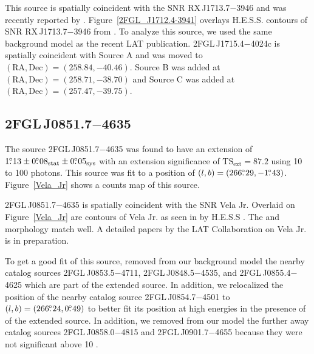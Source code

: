 \documentclass[12pt,preprint]{aastex}
\newcommand{\gev}{\text{GeV}\xspace}
\newcommand{\tev}{\text{TeV}\xspace}
\newcommand{\tsext}{{\ensuremath{\text{TS}_{\text{ext}}}}\xspace}
\newcommand{\sys}{\text{sys}\xspace}
\newcommand{\stat}{\text{stat}\xspace}
\begin{document}
This source is spatially coincident with the SNR RX\,J1713.7$-$3946
and was recently reported by \citep{rx_j1713_lat}.  
Figure~\ref{2FGL_J1712.4-3941} overlays H.E.S.S. \tev contours of SNR 
RX\,J1713.7$-$3946 from \citep{rx_j1713_hess}.  To analyze this source,
we used the same background model as the recent LAT publication.
2FGL\,J1715.4$-$4024c is spatially coincident with Source A and was
moved to $(\text{RA},\text{Dec})=(258.84,-40.46)$. Source B was added
at $(\text{RA},\text{Dec})=(258.71,-38.70)$ and Source C was added at
$(\text{RA},\text{Dec})=(257.47,-39.75)$.

\subsection{2FGL\,J0851.7$-$4635}
\label{section_2FGL_J0851.7-4635}


The source 2FGL\,J0851.7$-$4635 was found 
to have an
extension of $1\fdg13\pm0\fdg08_\stat\pm0\fdg05_\sys$ 
with an extension
significance of $\tsext=87.2$
using 10 \gev to 100 \gev photons.  This source was fit to a position of
$(l,b)=(266\mbox{$.\!\!^\circ$}29,-1\mbox{$.\!\!^\circ$}43)$.  Figure~\ref{Vela_Jr} shows a counts
map of this source.

2FGL\,J0851.7$-$4635 is spatially coincident with the SNR Vela Jr.
Overlaid on Figure~\ref{Vela_Jr} are contours of Vela Jr. as seen in
\tev by H.E.S.S \citep{vela_jr_hess}.  The \gev and \tev morphology
match well.  A detailed papers by the LAT Collaboration on Vela Jr. is
in preparation.

To get a good fit of this source, removed from
our background model the nearby catalog
sources 2FGL\,J0853.5$-$4711, 2FGL\,J0848.5$-$4535, and 2FGL\,J0855.4$-$4625
which are part of the extended source.  In addition, we relocalized
the position of the nearby catalog source 2FGL\,J0854.7$-$4501 to
$(l,b)=(266\mbox{$.\!\!^\circ$}24,0\mbox{$.\!\!^\circ$}49)$ to better fit its position at high energies
in the presence of of the extended source.  In addition, we removed from
our model the
further away catalog sources 2FGL\,J0858.0$-$4815 and 2FGL\,J0901.7$-$4655
because they were not significant above 10 \gev.  
\end{document}
